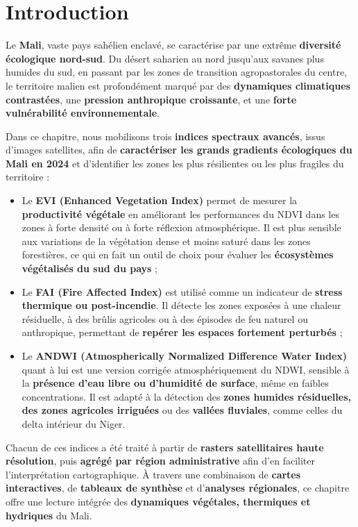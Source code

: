 \documentclass[
]{book}
\begin{document}
\section{Introduction}\label{introduction-2}

Le \textbf{Mali}, vaste pays sahélien enclavé, se caractérise par une extrême \textbf{diversité écologique nord-sud}. Du désert saharien au nord jusqu'aux savanes plus humides du sud, en passant par les zones de transition agropastorales du centre, le territoire malien est profondément marqué par des \textbf{dynamiques climatiques contrastées}, une \textbf{pression anthropique croissante}, et une \textbf{forte vulnérabilité environnementale}.

Dans ce chapitre, nous mobilisons trois \textbf{indices spectraux avancés}, issus d'images satellites, afin de \textbf{caractériser les grands gradients écologiques du Mali en 2024} et d'identifier les zones les plus résilientes ou les plus fragiles du territoire :

\begin{itemize}
\item
  Le \textbf{EVI (Enhanced Vegetation Index)} permet de mesurer la \textbf{productivité végétale} en améliorant les performances du NDVI dans les zones à forte densité ou à forte réflexion atmosphérique. Il est plus sensible aux variations de la végétation dense et moins saturé dans les zones forestières, ce qui en fait un outil de choix pour évaluer les \textbf{écosystèmes végétalisés du sud du pays} ;
\item
  Le \textbf{FAI (Fire Affected Index)} est utilisé comme un indicateur de \textbf{stress thermique ou post-incendie}. Il détecte les zones exposées à une chaleur résiduelle, à des brûlis agricoles ou à des épisodes de feu naturel ou anthropique, permettant de \textbf{repérer les espaces fortement perturbés} ;
\item
  Le \textbf{ANDWI (Atmospherically Normalized Difference Water Index)} quant à lui est une version corrigée atmosphériquement du NDWI, sensible à la \textbf{présence d'eau libre ou d'humidité de surface}, même en faibles concentrations. Il est adapté à la détection des \textbf{zones humides résiduelles, des zones agricoles irriguées} ou des \textbf{vallées fluviales}, comme celles du delta intérieur du Niger.
\end{itemize}

Chacun de ces indices a été traité à partir de \textbf{rasters satellitaires haute résolution}, puis \textbf{agrégé par région administrative} afin d'en faciliter l'interprétation cartographique. À travers une combinaison de \textbf{cartes interactives}, de \textbf{tableaux de synthèse} et d'\textbf{analyses régionales}, ce chapitre offre une lecture intégrée des \textbf{dynamiques végétales, thermiques et hydriques} du Mali.
\end{document}
